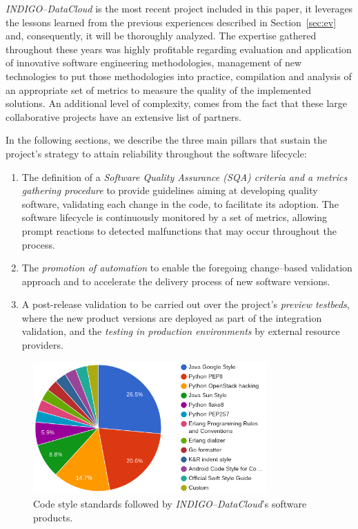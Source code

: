 {\sl INDIGO--DataCloud} is the most recent project included in this paper, it
leverages the lessons learned from the previous experiences described in
Section~\ref{sec:ev} and, consequently, it will be thoroughly analyzed. The expertise gathered throughout these years was highly
profitable regarding evaluation and application of innovative software engineering
methodologies, management of new technologies to put those methodologies
into practice, compilation and analysis of an appropriate set of metrics to measure the
quality of the implemented solutions.
An additional level of complexity, comes from the fact that these large collaborative projects
have an extensive list of partners.

In the following sections, we describe the three main pillars that sustain the project's strategy to attain reliability throughout the software lifecycle:

\begin{enumerate}
    \item The definition of a \textit{Software Quality Assurance (SQA) criteria and a metrics gathering procedure} to provide guidelines
    aiming at developing quality software, validating each change in the code, to facilitate its adoption. The software lifecycle is
    continuously monitored by a set of metrics, allowing prompt reactions to detected malfunctions that may occur throughout the process.
    \item The \textit{promotion of automation} to enable the foregoing change--based validation approach and to accelerate the delivery
    process of new software versions.
    \item A post-release validation to be carried out over the project's \textit{preview testbeds}, where the new product versions
    are deployed as part of the integration validation, and the \textit{testing in production environments} by external resource providers.
\end{enumerate}

\begin{figure}[ht]
\centering
\includegraphics[width=0.8\textwidth]{images/codestyle.png}
\caption{Code style standards followed by {\sl INDIGO--DataCloud}'s software products.}
\label{fig:fig_codestyle}
\end{figure}

